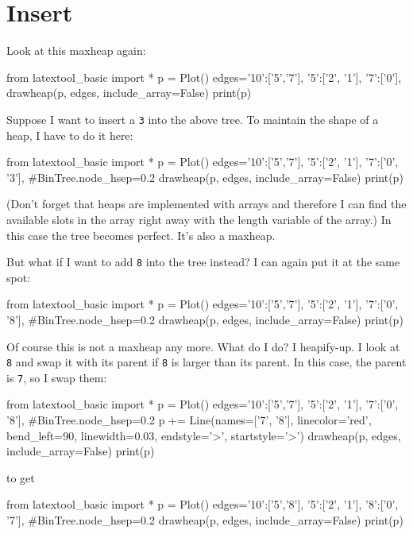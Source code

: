 \section{Insert}

Look at this maxheap again:

\begin{python}
from latextool_basic import *
p = Plot()
edges={'10':['5','7'],
       '5':['2', '1'],
       '7':['0'],
       }
drawheap(p, edges, include_array=False)
print(p)
\end{python}

Suppose I want to insert a \verb!3! into the above tree.
To maintain the shape of a heap, I have to do it here:

\begin{python}
from latextool_basic import *
p = Plot()
edges={'10':['5','7'],
       '5':['2', '1'],
       '7':['0', '3'],
     }
#BinTree.node_hsep=0.2
drawheap(p, edges, include_array=False)
print(p)
\end{python}


(Don't forget that heaps are implemented with arrays
and therefore I can find the available slots in the array
right away with the length variable of the array.)
In this case the tree becomes perfect.
It's also a maxheap.

But what if I want to add \verb!8! into the tree instead?
I can again put it at the same spot:

\begin{python}
from latextool_basic import *
p = Plot()
edges={'10':['5','7'],
       '5':['2', '1'],
       '7':['0', '8'],
     }
#BinTree.node_hsep=0.2
drawheap(p, edges, include_array=False)
print(p)
\end{python}

Of course this is not a maxheap any more.
What do I do?
I heapify-up.
I look at \verb!8!
and swap it with its parent if \verb!8! is larger than
its parent.
In this case, the parent is \verb!7!, so I swap them:

\begin{python}
from latextool_basic import *
p = Plot()
edges={'10':['5','7'],
       '5':['2', '1'],
       '7':['0', '8'],
     }
#BinTree.node_hsep=0.2
p += Line(names=['7', '8'], linecolor='red', bend_left=90,
          linewidth=0.03, endstyle='>', startstyle='>')
drawheap(p, edges, include_array=False)
print(p)
\end{python}

to get

\begin{python}
from latextool_basic import *
p = Plot()
edges={'10':['5','8'],
       '5':['2', '1'],
       '8':['0', '7'],
     }
#BinTree.node_hsep=0.2
drawheap(p, edges, include_array=False)
print(p)
\end{python}

